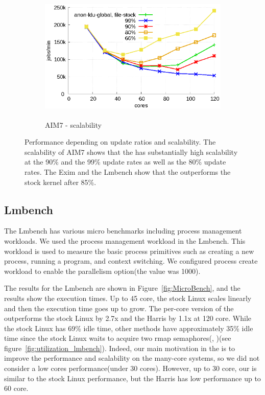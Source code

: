 \begin{figure}[t!]
    \centering
    \begin{subfigure}[b]{1\textwidth}
        \includegraphics[height=2.5in]{graph/ratio_lmbench_core.eps}
        \caption{AIM7 - scalability}
    \end{subfigure}%
    \caption{Performance depending on update ratios and scalability.
    The scalability of AIM7 shows that the \LDU has substantially high
    scalability at the 90\% and the 99\% update rates as well as
    the 80\% update rates. The Exim and the Lmbench show that the \LDU outperforms the stock kernel after 85\%.}
    \label{fig:UpdateRate_lmbench_2}
\end{figure}


\subsection{Lmbench}
The Lmbench has various micro benchmarks including process management workloads.
We used the process management workload in the Lmbench.
This workload is used to measure the basic process primitives such as creating a
new process, running a program, and context switching.
We configured process create workload to enable the parallelism option(the
value was 1000).

The results for the Lmbench are shown in Figure~\ref{fig:MicroBench}, 
and the results show the execution times.
Up to 45 core, the stock Linux scales linearly and then the execution time goes
up to grow.
The per-core version of the \LDU outperforms the stock Linux by 2.7x and the Harris by
1.1x at 120 core.
While the stock Linux has 69\% idle time, other methods have approximately 35\%
idle time since the stock Linux waits to acquire two rmap
semaphores(, )(see
figure~\ref{fig:utilization_lmbench}).
Indeed, our main motivation in the \LDU is to improve the performance and scalability on
the many-core systems, so we did not consider a low cores performance(under 30 cores).
However, up to 30 core, our \LDU is similar to the stock Linux performance, but
the Harris has low performance up to 60 core.

